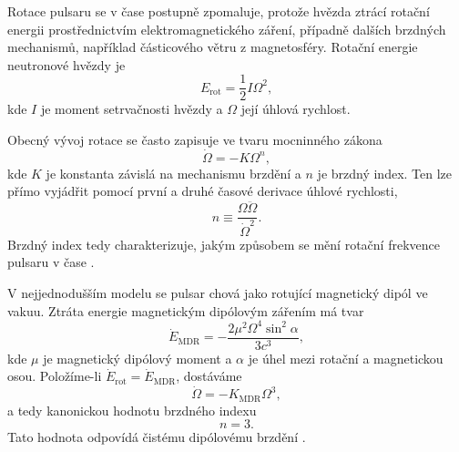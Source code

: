 \documentclass[%
final%
,htext%
]{ipothes}
\begin{document}
Rotace pulsaru se v čase postupně zpomaluje, protože hvězda ztrácí rotační energii prostřednictvím elektromagnetického záření, případně dalších brzdných mechanismů, například částicového větru z magnetosféry. Rotační energie neutronové hvězdy je
\begin{equation}
    E_{\mathrm{rot}}
    =
    \frac{1}{2}I\Omega^2,
    \label{eq:rotational_energy}
\end{equation}
kde $I$ je moment setrvačnosti hvězdy a $\Omega$ její úhlová rychlost.

Obecný vývoj rotace se často zapisuje ve tvaru mocninného zákona
\begin{equation}
    \dot{\Omega}
    =
    -K\Omega^n,
    \label{eq:spin_down_law}
\end{equation}
kde $K$ je konstanta závislá na mechanismu brzdění a $n$ je brzdný index. Ten lze přímo vyjádřit pomocí první a druhé časové derivace úhlové rychlosti,
\begin{equation}
    n
    \equiv
    \frac{\Omega \ddot{\Omega}}{\dot{\Omega}^2}.
    \label{eq:braking_index_definition}
\end{equation}
Brzdný index tedy charakterizuje, jakým způsobem se mění rotační frekvence pulsaru v čase \cite{ghosh2007}.

V nejjednodušším modelu se pulsar chová jako rotující magnetický dipól ve vakuu. Ztráta energie magnetickým dipólovým zářením má tvar
\begin{equation}
    \dot{E}_{\mathrm{MDR}}
    =
    -
    \frac{2\mu^2\Omega^4\sin^2\alpha}{3c^3},
    \label{eq:magnetic_dipole_loss}
\end{equation}
kde $\mu$ je magnetický dipólový moment a $\alpha$ je úhel mezi rotační a magnetickou osou. Položíme-li $\dot{E}_{\mathrm{rot}}=\dot{E}_{\mathrm{MDR}}$, dostáváme
\begin{equation}
    \dot{\Omega}
    =
    -K_{\mathrm{MDR}}\Omega^3,
    \label{eq:magnetic_dipole_spin_down}
\end{equation}
a tedy kanonickou hodnotu brzdného indexu
\begin{equation}
    n = 3.
    \label{eq:braking_index_mdr}
\end{equation}
Tato hodnota odpovídá čistému dipólovému brzdění \cite{ghosh2007}.
\end{document}
